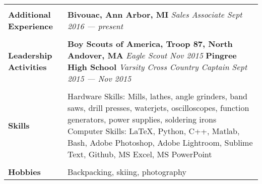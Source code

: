 \documentclass[11pt]{article}
\begin{document}
\begin{table}[H]
\begin{tabularx}{\textwidth}{@{}X p{5.25in} @{}}
		 & \\

		\textbf{Additional Experience} & \textbf{Bivouac, Ann Arbor, MI} \newline \textit{Sales Associate \hfill Sept 2016 --- present} \\

		 & \\

		\textbf{Leadership Activities} & \textbf{Boy Scouts of America, Troop 87, North Andover, MA} \newline \textit{Eagle Scout \hfill Nov 2015} \newline \textbf{Pingree High School} \newline \textit{Varsity Cross Country Captain \hfill Sept 2015 --- Nov 2015} \\

		 & \\

		\textbf{Skills} & Hardware Skills: Mills, lathes, angle grinders, band saws, drill presses, waterjets, oscilloscopes, function generators, power supplies, soldering irons \vspace{0.0625in} \newline Computer Skills: \LaTeX, Python, C++, Matlab, Bash, Adobe Photoshop, Adobe Lightroom, Sublime Text, Github, MS Excel, MS PowerPoint \\

		 & \\

		\textbf{Hobbies} & Backpacking, skiing, photography \\
		
	\end{tabularx}
\end{table}
\end{document}
